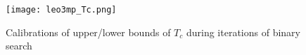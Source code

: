 \begin{figure}
    \centering
    \texttt{[image: leo3mp\_Tc.png]} %
    \caption{Calibrations of upper/lower bounds of $T_{c}$ during iterations of binary search}
    \label{fig:Tc}
\end{figure}